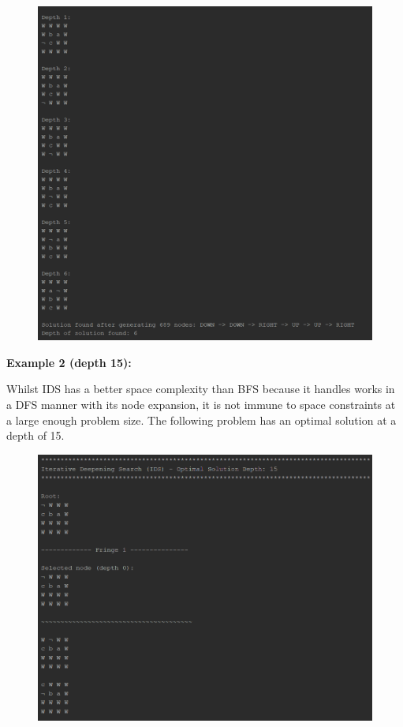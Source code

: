 \documentclass{article}
\begin{document}
	\begin{figure}[h]
		\centering
		\includegraphics[height=0.6\textheight]{IDS-1-6.png}
	\end{figure}

	\newpage
	\textbf{Example 2 (depth 15):}
	
	Whilst IDS has a better space complexity than BFS because it handles works in a DFS manner with its node expansion, it is not immune to space constraints at a large enough problem size. The following problem has an optimal solution at a depth of 15.
	
	\begin{figure}[h]
		\centering
		\includegraphics[height=0.6\textheight]{IDS-2-1.png}
	\end{figure}
	
\end{document}
